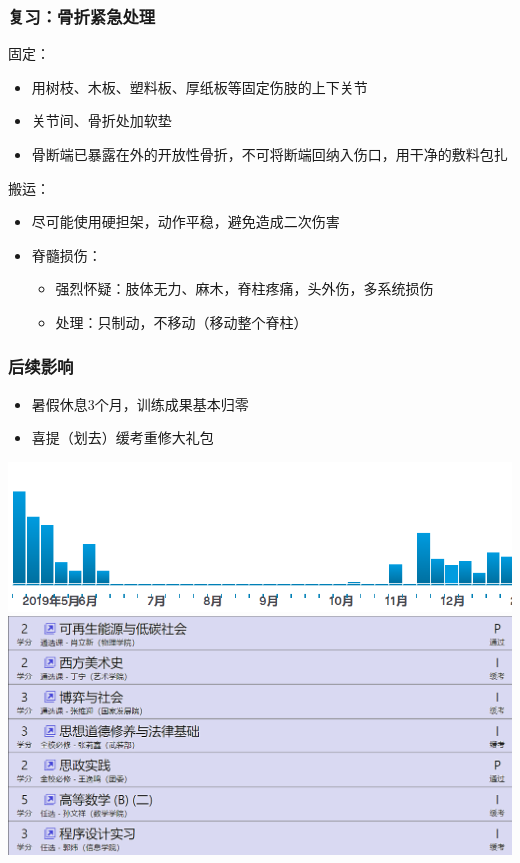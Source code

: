 \documentclass[12pt,AutoFakeBold]{beamer}
\begin{document}
    \begin{frame}
        \frametitle{复习：骨折紧急处理}
        固定：
        \begin{itemize}
            \item 用树枝、木板、塑料板、厚纸板等固定伤肢的上下关节
            \item 关节间、骨折处加软垫
            \item 骨断端已暴露在外的开放性骨折，不可将断端回纳入伤口，用干净的敷料包扎
        \end{itemize}
        
        搬运：
        \begin{itemize}
            \item 尽可能使用硬担架，动作平稳，避免造成二次伤害
            \item 脊髓损伤：
            \begin{itemize}
                \item 强烈怀疑：肢体无力、麻木，脊柱疼痛，头外伤，多系统损伤
                \item 处理：只制动，不移动（移动整个脊柱）
            \end{itemize}
        \end{itemize}
    \end{frame}

    \begin{frame}
        \frametitle{后续影响}
        \begin{itemize}
            \item 暑假休息3个月，训练成果基本归零
            \item 喜提（划去）缓考重修大礼包
        \end{itemize}
        \begin{center}
            \includegraphics[width=0.618\paperwidth]{figures/training.png}
            \includegraphics[width=0.618\paperwidth]{figures/result.png}    
        \end{center}
        
    \end{frame}
\end{document}
